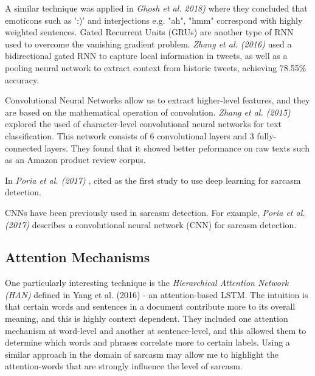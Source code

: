 \documentclass[12pt,a4paper]{article}
\begin{document}



 A similar technique was applied in \textit{Ghosh et al. 2018)} \cite{ghosh2018sarcasm} where they concluded that emoticons such as ':)' and interjections e.g. "ah", "hmm" correspond with highly weighted sentences. Gated Recurrent Units (GRUs) are another type of RNN used to overcome the vanishing gradient problem.  \textit{Zhang et al. (2016)} \cite{zhang2016tweet} used a bidirectional gated RNN to capture local information in tweets, as well as a pooling neural network to extract context from historic tweets, achieving 78.55\% accuracy.

Convolutional Neural Networks allow us to extract higher-level features, and they are based on the mathematical operation of convolution. \textit{Zhang et al. (2015)}  \cite{zhang2015character} explored the used of character-level convolutional neural networks for text classification. This network consists of 6 convolutional layers and 3 fully-connected layers. They found that it showed better peformance on raw texts such as an Amazon product review corpus.

In \textit{Poria et al. (2017)} \cite{poria2016deeper}, cited as the first study to use deep learning for sarcasm detection.


CNNs have been previously used in sarcasm detection. For example, \textit{Poria et al. (2017)} \cite{poria2016deeper} describes a convolutional neural network (CNN) for sarcasm detection. \\

\subsection{Attention Mechanisms}\vspace{-10pt}
One particularly interesting technique is the \textit{Hierarchical Attention Network (HAN)} defined in Yang et al. (2016) \cite{yang2016hierarchical} - an attention-based LSTM. The intuition is that certain words and sentences in a document contribute more to its overall meaning, and this is highly context dependent. They included one attention mechanism at word-level and another at sentence-level, and this allowed them to determine which words and phrases correlate more to certain labels. Using a similar approach in the domain of sarcasm may allow me to highlight the attention-words that are strongly influence the level of sarcasm.
\end{document}
